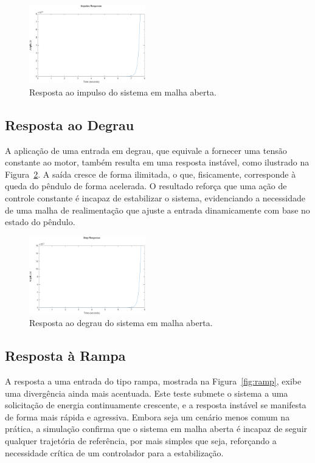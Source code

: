 \documentclass[9pt,a4paper,twocolumn,twoside]{tau-class/tau}
\begin{document}
\begin{figure}[H]
    \centering
    \includegraphics[width=0.45\textwidth]{figures/impulse_response.png}
    \caption{Resposta ao impulso do sistema em malha aberta.}
    \label{fig:impulse}
\end{figure}

\subsection{Resposta ao Degrau}
A aplicação de uma entrada em degrau, que equivale a fornecer uma tensão constante ao motor, também resulta em uma resposta instável, como ilustrado na Figura~\ref{fig:step}. A saída cresce de forma ilimitada, o que, fisicamente, corresponde à queda do pêndulo de forma acelerada. O resultado reforça que uma ação de controle constante é incapaz de estabilizar o sistema, evidenciando a necessidade de uma malha de realimentação que ajuste a entrada dinamicamente com base no estado do pêndulo.

\begin{figure}[H]
    \centering
    \includegraphics[width=0.45\textwidth]{figures/step_response.png}
    \caption{Resposta ao degrau do sistema em malha aberta.}
    \label{fig:step}
\end{figure}

\subsection{Resposta à Rampa}
A resposta a uma entrada do tipo rampa, mostrada na Figura~\ref{fig:ramp}, exibe uma divergência ainda mais acentuada. Este teste submete o sistema a uma solicitação de energia continuamente crescente, e a resposta instável se manifesta de forma mais rápida e agressiva. Embora seja um cenário menos comum na prática, a simulação confirma que o sistema em malha aberta é incapaz de seguir qualquer trajetória de referência, por mais simples que seja, reforçando a necessidade crítica de um controlador para a estabilização.
\end{document}
